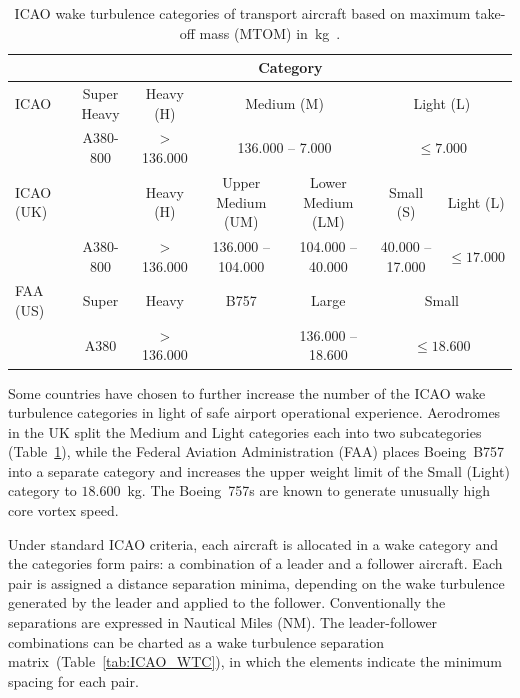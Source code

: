 \begin{table}[ht]
    \centering
    \resizebox{1\textwidth}{!} {
    \begin{tabular}{l|c|c|c|c|c|c}
    ~    & \multicolumn{6}{c}{Category} \\ \hline
    ICAO & Super Heavy & Heavy (H) & \multicolumn{2}{c|}{Medium (M)} & \multicolumn{2}{c}{Light (L)} \\
    
    ~    & A380-800    & > 136.000  & \multicolumn{2}{c|}{ 136.000 -- 7.000 } & \multicolumn{2}{c}{$ \leq 7.000$} \\ \hline
    
    ICAO (UK)   & ~  & Heavy (H) & Upper Medium (UM) & Lower Medium (LM) & Small (S)  & Light (L) \\
    
    ~    & A380-800    & > 136.000  & 136.000 -- 104.000     & 104.000 -- 40.000      & 40.000 -- 17.000 & $ \leq 17.000 $   \\ \hline
    
    FAA (US)   & Super      & Heavy & B757   & Large   & \multicolumn{2}{c}{Small} \\
    
    ~    & A380        &  > 136.000   & ~                 &  136.000 -- 18.600       & \multicolumn{2}{c}{$ \leq 18.600 $} \\ 
    \end{tabular}}
    \caption[ICAO wake turbulence categories based on maximum take-off mass]{ICAO wake turbulence categories of transport aircraft based on maximum take-off mass (MTOM) in~kg~\cite{doc4444full, uk_aeronautical_information_services_wake_2017, kolos2013influence}.} \label{tab:WTC}
\end{table}

Some countries have chosen to further increase the number of the ICAO wake turbulence categories in light of safe airport operational experience. Aerodromes in the UK split the Medium and Light categories each into two subcategories (Table~\ref{tab:WTC}), while the Federal Aviation Administration (FAA) places Boeing~B757 into a separate category and increases the upper weight limit of the Small (Light) category to $18.600$~kg. The Boeing~757s are known to generate unusually high core vortex speed.~\cite{icao_wtc, uk_aeronautical_information_services_wake_2017, noauthor_recat_2018}

Under standard ICAO criteria, each aircraft is allocated in a wake category and the categories form pairs: a combination of a leader and a follower aircraft. Each pair is assigned a distance separation minima, depending on the wake turbulence generated by the leader and applied to the follower. Conventionally the separations are expressed in Nautical Miles (NM). The leader-follower combinations can be charted as a wake turbulence separation matrix~(Table~\ref{tab:ICAO_WTC}), in which the elements indicate the minimum spacing for each pair.

